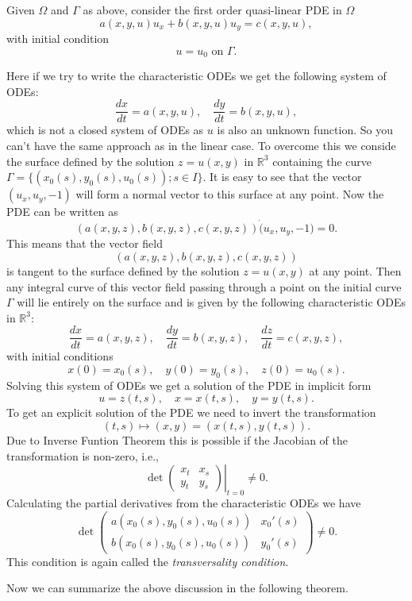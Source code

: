\documentclass[12pt]{exam}
\begin{document}
	Given $\Omega$ and $\Gamma$ as above, consider the first order quasi-linear PDE in $\Omega$
	\[a(x,y,u)u_x + b(x,y,u)u_y = c(x,y,u),\]
	with initial condition
	\[u=u_0 \text{ on } \Gamma.\]
	
	Here if we try to write the characteristic ODEs we get the following system of ODEs:
	\[\frac{dx}{dt} = a(x,y,u), \quad \frac{dy}{dt} = b(x,y,u),\]
	which is not a closed system of ODEs as \( u \) is also an unknown function. So you can't have the same approach as in the linear case. To overcome this we conside the surface defined by the solution \( z = u(x,y) \) in \( \mathbb{R}^3 \) containing the curve $\Gamma=\{(x_0(s),y_0(s),u_0(s));s\in I\}$. It is easy to see that the vector $(u_x,u_y,-1)$ will form a normal vector to this surface at any point. Now the PDE can be written as
	\[(a(x,y,z),b(x,y,z),c(x,y,z)) \dot (u_x,u_y,-1) = 0.\]
	This means that the vector field
	\[(a(x,y,z),b(x,y,z),c(x,y,z))\]
	is tangent to the surface defined by the solution \( z = u(x,y) \) at any point. Then any integral curve of this vector field passing through a point on the initial curve $\Gamma$ will lie entirely on the surface and is given by the following characteristic ODEs in \( \mathbb{R}^3 \):
	\[\frac{dx}{dt} = a(x,y,z), \quad \frac{dy}{dt} = b(x,y,z), \quad \frac{dz}{dt} = c(x,y,z),\]
	with initial conditions
	\[x(0) = x_0(s), \quad y(0) = y_0(s), \quad z(0) = u_0(s).\]
	Solving this system of ODEs we get a solution of the PDE in implicit form
	\[u = z(t,s), \quad x = x(t,s), \quad y = y(t,s).\]
	To get an explicit solution of the PDE we need to invert the transformation
	\[(t,s) \mapsto (x,y) = (x(t,s), y(t,s)).\]
	Due to Inverse Funtion Theorem this is possible if the Jacobian of the transformation is non-zero, i.e.,
	\[\det \left.\begin{pmatrix}
		x_t & x_s \\
		y_t & y_s
		\end{pmatrix}\right|_{t=0} \neq 0.\]
	Calculating the partial derivatives from the characteristic ODEs we have
	\[\det \begin{pmatrix}
		a(x_0(s),y_0(s),u_0(s)) & x_0'(s) \\
		b(x_0(s),y_0(s),u_0(s)) & y_0'(s)
		\end{pmatrix} \neq 0.\]
	This condition is again called the \textit{transversality condition}.
	
	Now we can summarize the above discussion in the following theorem.
\end{document}
